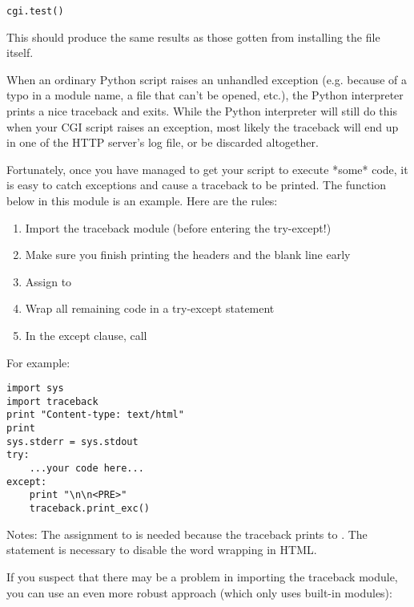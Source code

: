 \bcode\begin{verbatim}
cgi.test()
\end{verbatim}\ecode
%
This should produce the same results as those gotten from installing
the  file itself.

When an ordinary Python script raises an unhandled exception
(e.g. because of a typo in a module name, a file that can't be opened,
etc.), the Python interpreter prints a nice traceback and exits.
While the Python interpreter will still do this when your CGI script
raises an exception, most likely the traceback will end up in one of
the HTTP server's log file, or be discarded altogether.

Fortunately, once you have managed to get your script to execute
*some* code, it is easy to catch exceptions and cause a traceback to
be printed.  The  function below in this module is an example.
Here are the rules:

\begin{enumerate}
	\item Import the traceback module (before entering the
	   try-except!)
	
	\item Make sure you finish printing the headers and the blank
	   line early
	
	\item Assign  to 
	
	\item Wrap all remaining code in a try-except statement
	
	\item In the except clause, call 
\end{enumerate}

For example:

\bcode\begin{verbatim}
import sys
import traceback
print "Content-type: text/html"
print
sys.stderr = sys.stdout
try:
    ...your code here...
except:
    print "\n\n<PRE>"
    traceback.print_exc()
\end{verbatim}\ecode
%
Notes: The assignment to  is needed because the traceback
prints to .
The  statement is necessary to
disable the word wrapping in HTML.

If you suspect that there may be a problem in importing the traceback
module, you can use an even more robust approach (which only uses
built-in modules):

